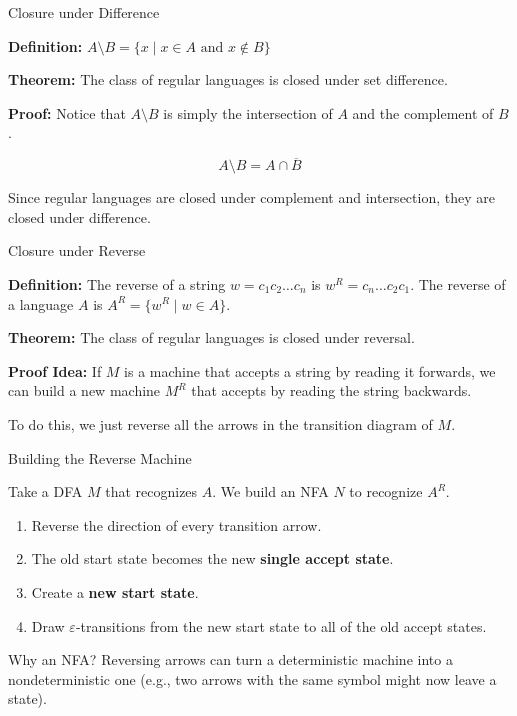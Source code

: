 \documentclass[10pt,aspectratio=169]{beamer}
\newcommand{\eps}{\varepsilon}
\begin{document}
\begin{frame}{Closure under Difference}

\textbf{Definition:} $A \setminus B = \{x \mid x \in A \text{ and } x \notin B\}$

\vspace{1em}
\textbf{Theorem:} The class of regular languages is closed under set difference.

\vspace{1em}
\pause
\textbf{Proof:}
Notice that $A \setminus B$ is simply the intersection of $A$ and the complement of $B$.

\[
A \setminus B = A \cap \overline{B}
\]

Since regular languages are closed under complement and intersection, they are closed under difference.

\end{frame}

\begin{frame}{Closure under Reverse}

\textbf{Definition:} The reverse of a string $w = c_1c_2\dots c_n$ is $w^R = c_n\dots c_2c_1$.
The reverse of a language $A$ is $A^R = \{w^R \mid w \in A\}$.

\vspace{1em}
\textbf{Theorem:} The class of regular languages is closed under reversal.

\vspace{1em}
\pause
\textbf{Proof Idea:} 
If $M$ is a machine that accepts a string by reading it forwards, we can build a new machine $M^R$ that accepts by reading the string backwards. 

To do this, we just reverse all the arrows in the transition diagram of $M$.

\end{frame}

\begin{frame}{Building the Reverse Machine}

Take a DFA $M$ that recognizes $A$. We build an NFA $N$ to recognize $A^R$.

\vspace{1em}
\begin{enumerate}
    \item Reverse the direction of every transition arrow.
    \item The old start state becomes the new \textbf{single accept state}.
    \item Create a \textbf{new start state}.
    \item Draw $\eps$-transitions from the new start state to all of the old accept states.
\end{enumerate}

\vspace{1em}
\pause
Why an NFA? 
Reversing arrows can turn a deterministic machine into a nondeterministic one (e.g., two arrows with the same symbol might now leave a state).

\end{frame}
\end{document}
